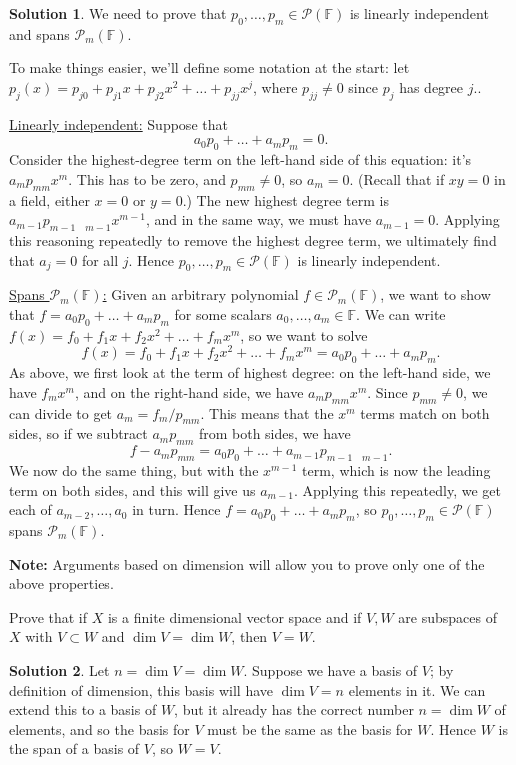 \documentclass[12pt]{article}
\theoremstyle{definition}
\theoremstyle{definition}
\newtheorem*{soln}{Solution}
\newcommand{\F}{\mathbb{F}}
\begin{document}
\begin{soln}
We need to prove that $p_0,\dots,p_m\in\mathcal{P}(\F)$ is linearly independent and spans $\mathcal{P}_m(\F)$.

To make things easier, we'll define some notation at the start: let $p_j(x)=p_{j0}+p_{j1}x+p_{j2}x^2+\dots+p_{jj}x^j$, where $p_{jj}\neq 0$ since $p_j$ has degree $j$..

\underline{Linearly independent:}
Suppose that
\[a_0p_0+\dots+a_mp_m=0.\]
Consider the highest-degree term on the left-hand side of this equation: it's $a_mp_{mm}x^m$. This has to be zero, and $p_{mm}\neq 0$, so $a_m=0$. (Recall that if $xy=0$ in a field, either $x=0$ or $y=0$.) The new highest degree term is $a_{m-1}p_{m-1\quad m-1}x^{m-1}$, and in the same way, we must have $a_{m-1}=0$. Applying this reasoning repeatedly to remove the highest degree term, we ultimately find that $a_j=0$ for all $j$. Hence $p_0,\dots,p_m\in\mathcal{P}(\F)$ is linearly independent.

\underline{Spans $\mathcal{P}_m(\F)$:} Given an arbitrary polynomial $f\in \mathcal{P}_m(\F)$, we want to show that $f=a_0p_0+\dots+a_mp_m$ for some scalars $a_0,\dots,a_m\in \F$. We can write $f(x)=f_0+f_1x+f_2x^2+\dots+f_mx^m$, so we want to solve
\[f(x)=f_0+f_1x+f_2x^2+\dots+f_mx^m = a_0p_0+\dots+a_mp_m.\]
As above, we first look at the term of highest degree: on the left-hand side, we have $f_mx^m$, and on the right-hand side, we have $a_mp_{mm}x^m$. Since $p_{mm}\neq 0$, we can divide to get $a_m=f_m/p_{mm}$. This means that the $x^m$ terms match on both sides, so if we subtract $a_mp_{mm}$ from both sides, we have
\[f-a_mp_{mm} = a_0p_0+\dots+a_{m-1}p_{m-1\quad m-1}.\]
We now do the same thing, but with the $x^{m-1}$ term, which is now the leading term on both sides, and this will give us $a_{m-1}$. Applying this repeatedly, we get each of $a_{m-2},\dots, a_0$ in turn. Hence $f=a_0p_0+\dots+a_mp_m$, so $p_0,\dots,p_m\in\mathcal{P}(\F)$ spans $\mathcal{P}_m(\F)$.

\textbf{Note:} Arguments based on dimension will allow you to prove only one of the above properties.
\end{soln}

\break

\begin{prob}
Prove that if $X$ is a finite dimensional vector space and if $V,W$ are subspaces of $X$ with $V\subset W$ and $\dim V= \dim W$, then $V=W$.
\end{prob}

\begin{soln}
Let $n=\dim V=\dim W$. Suppose we have a basis of $V$; by definition of dimension, this basis will have $\dim V=n$ elements in it. We can extend this to a basis of $W$, but it already has the correct number $n=\dim W$ of elements, and so the basis for $V$ must be the same as the basis for $W$. Hence $W$ is the span of a basis of $V$, so $W=V$.
\end{soln}
\end{document}
